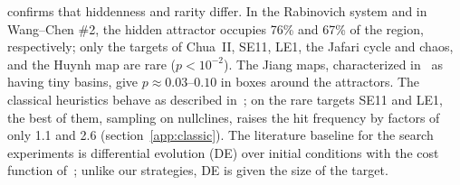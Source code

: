  confirms that hiddenness and rarity differ. In the Rabinovich system and in Wang--Chen \#2, the hidden attractor occupies 76\% and 67\% of the region, respectively; only the targets of Chua~II, SE11, LE1, the Jafari cycle and chaos, and the Huynh map are rare ($p<10^{-2}$). The Jiang maps, characterized in~\cite{Jiang2016Maps} as having tiny basins, give $p\approx0.03$--$0.10$ in boxes around the attractors. The classical heuristics behave as described in~\cite{GuanXie2025}; on the rare targets SE11 and LE1, the best of them, sampling on nullclines, raises the hit frequency by factors of only 1.1 and 2.6 (section~\ref{app:classic}). The literature baseline for the search experiments is differential evolution (DE) over initial conditions with the cost function of~\cite{Zelinka2016}; unlike our strategies, DE is given the size of the target.

